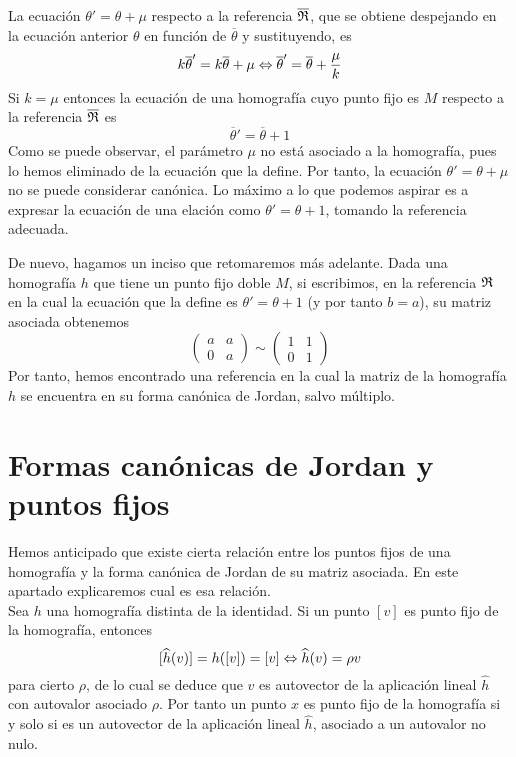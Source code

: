 La ecuación $\theta'=\theta+\mu$ respecto a la referencia $\overline{\mathfrak{R}}$, que se obtiene despejando en la ecuación anterior $\theta$ en función de $\overline{\theta}$ y sustituyendo, es
\begin{equation*}
	k\overline{\theta}'=k\overline{\theta}+\mu\Leftrightarrow \overline{\theta}'=\overline{\theta}+\frac{\mu}{k}
\end{equation*}
Si $k=\mu$ entonces la ecuación de una homografía cuyo punto fijo es $M$ respecto a la referencia $\overline{\mathfrak{R}}$ es
\begin{equation*}
	\overline{\theta}'=\overline{\theta}+1
\end{equation*}
Como se puede observar, el parámetro $\mu$ no está asociado a la homografía, pues lo hemos eliminado de la ecuación que la define. Por tanto, la ecuación $\theta'=\theta+\mu$ no se puede considerar canónica. Lo máximo a lo que podemos aspirar es a expresar la ecuación de una elación como $\theta'=\theta+1$, tomando la referencia adecuada.

De nuevo, hagamos un inciso que retomaremos más adelante. Dada una homografía $h$ que tiene un punto fijo doble $M$, si escribimos, en la referencia $\mathfrak{R}$ en la cual la ecuación que la define es $\theta'=\theta+1$ (y por tanto $b=a$), su matriz asociada obtenemos
\begin{equation*}
\left( \begin{array}{cc}
a&a\\
0&a
\end{array}\right) 
\sim \left( \begin{array}{cc}
1&1\\
0&1
\end{array}\right) 
\end{equation*}
Por tanto, hemos encontrado una referencia en la cual la matriz de la homografía $h$ se encuentra en su forma canónica de Jordan, salvo múltiplo.

\section{Formas canónicas de Jordan y puntos fijos}
Hemos anticipado que existe cierta relación entre los puntos fijos de una homografía y la forma canónica de Jordan de su matriz asociada. En este apartado explicaremos cual es esa relación.\\

Sea $h$ una homografía distinta de la identidad. Si un punto $[v]$ es punto fijo de la homografía, entonces 
\begin{equation}
	\label{C6_eq_puntofijo_autovector}
	[\widehat{h}(v)]=h([v])=[v]\Leftrightarrow \widehat{h}(v)=\rho v
\end{equation}
para cierto $\rho$, de lo cual se deduce que $v$ es autovector de la aplicación lineal $\widehat{h}$ con autovalor asociado $\rho$. Por tanto un punto $x$ es punto fijo de la homografía si y solo si es un autovector de la aplicación lineal $\widehat{h}$, asociado a un autovalor no nulo.

